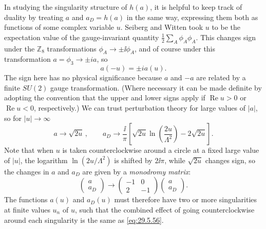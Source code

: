In studying the singularity structure of \(h(a)\), it is helpful to keep
track of duality by treating \(a\) and \(a_D=h(a)\) in the same way,
expressing them both as functions of some complex variable \(u\). Seiberg
and Witten took \(u\) to be the expectation value of the gauge-invariant
quantity \(\tfrac12\sum_A\phi_A\phi_A\). This changes sign under the
\(\mathbb{Z}_8\) transformations \(\phi_A\longrightarrow\pm \ii\phi_A\), and
of course under this transformation \(a=\phi_3\longrightarrow\pm ia\), so
\begin{equation}
  a(-u)=\pm ia(u).
  \tag{29.5.54}\label{eq:29.5.54}
\end{equation}
The sign here has no physical significance because \(a\) and \(-a\) are
related by a finite \(SU(2)\) gauge transformation. (Where necessary it can
be made definite by adopting the convention that the upper and lower signs
apply if \(\operatorname{Re}u>0\) or \(\operatorname{Re}u<0\),
respectively.) We can trust perturbation theory for large values of
\(\lvert a\rvert\), so for \(\lvert u\rvert\longrightarrow\infty\)
\begin{equation}
  a\longrightarrow\sqrt{2u}\,,
  \qquad
  a_D\longrightarrow\frac{\ii}{\pi}\left[
    \sqrt{2u}\ln\left(\frac{2u}{\Lambda^2}\right)-2\sqrt{2u}
  \right].
  \tag{29.5.55}\label{eq:29.5.55}
\end{equation}
Note that when \(u\) is taken counterclockwise around a circle at a fixed
large value of \(\lvert u\rvert\), the logarithm
\(\ln(2u/\Lambda^2)\) is shifted by \(2\ii\pi\), while \(\sqrt{2u}\) changes
sign, so the changes in \(a\) and \(a_D\) are given by a \textit{monodromy
matrix}:
\begin{equation}
  \begin{pmatrix}
    a\\ a_D
  \end{pmatrix}
  \longrightarrow
  \begin{pmatrix}
    -1&0\\ 2&-1
  \end{pmatrix}
  \begin{pmatrix}
    a\\ a_D
  \end{pmatrix}.
  \tag{29.5.56}\label{eq:29.5.56}
\end{equation}
The functions \(a(u)\) and \(a_D(u)\) must therefore have two or more
singularities at finite values \(u_n\) of \(u\), such that the combined
effect of going counterclockwise around each singularity is the same as
\eqref{eq:29.5.56}.

